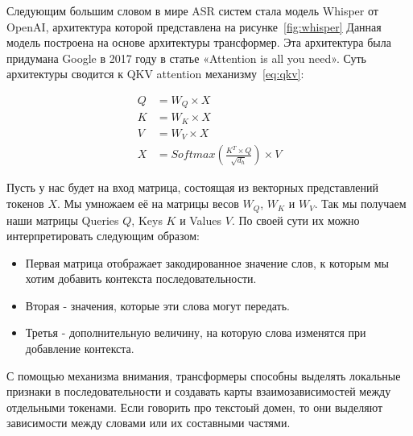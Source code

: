 Следующим большим словом в мире ASR систем стала модель Whisper от OpenAI\cite{radford2023robust}, архитектура которой представлена на рисунке~\ref{fig:whisper}
Данная модель построена на основе архитектуры трансформер\cite{devlin2019bert,radford2018improving,radford2019language}.
Эта архитектура была придумана Google в 2017 году в статье «Attention is all you need»\cite{vaswani2017attention}.
Суть архитектуры сводится к QKV attention механизму~\ref{eq:qkv}:

\begin{equation}
  \begin{aligned}
    Q &= W_Q \times X \\
    K &= W_K \times X \\
    V &= W_V \times X \\
    X &= Softmax(\frac{K^T \times Q}{\sqrt{d_h}}) \times V
  \end{aligned}
  \label{eq:qkv}
\end{equation}

Пусть у нас будет на вход матрица, состоящая из векторных представлений токенов $X$.
Мы умножаем её на матрицы весов $W_Q$, $W_K$ и $W_V$.
Так мы получаем наши матрицы Queries $Q$, Keys $K$ и Values $V$.
По своей сути их можно интерпретировать следующим образом:
\begin{itemize}
  \item Первая матрица отображает закодированное значение слов, к которым мы хотим добавить контекста последовательности.
  \item Вторая - значения, которые эти слова могут передать.
  \item Третья - дополнительную величину, на которую слова изменятся при добавление контекста.
\end{itemize} 

С помощью механизма внимания, трансформеры способны выделять локальные признаки в последовательности и создавать карты взаимозависимостей между отдельными токенами.
Если говорить про текстоый домен, то они выделяют зависимости между словами или их составными частями.

